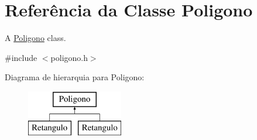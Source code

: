 \hypertarget{classPoligono}{}\section{Referência da Classe Poligono}
\label{classPoligono}


A \mbox{\hyperlink{classPoligono}{Poligono}} class.  




{\ttfamily \#include $<$poligono.\+h$>$}

Diagrama de hierarquia para Poligono\+:\begin{figure}[H]
\begin{center}
\leavevmode
\includegraphics[height=2.000000cm]{classPoligono}
\end{center}
\end{figure}
